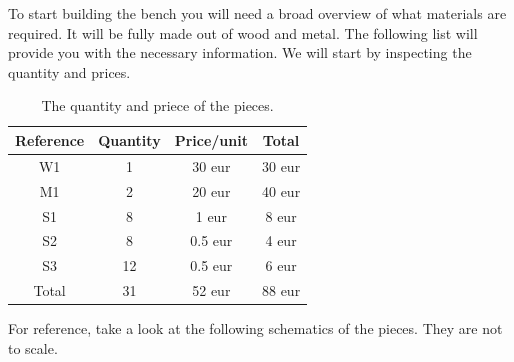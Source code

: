 \documentclass{subfiles}
\begin{document}
    To start building the bench you will need a broad overview of what materials are required. It will be fully made out of wood and metal. The following list will provide you with the necessary information. We will start by inspecting the quantity and prices.
    \begin{table}[H]
        \centering
            \begin{tabular}[ht]{|c|c|c|c|}
                \hline
               Reference & Quantity & Price/unit & Total \\\hline\hline
                W1 & 1 & 30 eur & 30 eur \\\hline
                M1 & 2 & 20 eur & 40 eur \\\hline
                S1 & 8 & 1 eur & 8 eur \\\hline
                S2 & 8 & 0.5 eur & 4 eur \\\hline
                S3 & 12 & 0.5 eur & 6 eur \\\hline\hline
                Total & 31 & 52 eur & 88 eur \\\hline
            \end{tabular}
            \label{tab:Pieces}
            \caption{The quantity and priece of the pieces.}
       \end{table}
    For reference, take a look at the following schematics of the pieces. They are not to scale.
\end{document}
